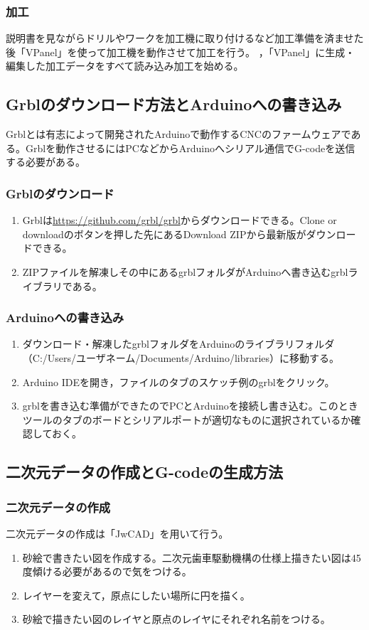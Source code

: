 \documentclass[dvipdfmx]{jsarticle}
\begin{document}
\subsubsection{加工}
説明書を見ながらドリルやワークを加工機に取り付けるなど加工準備を済ませた後「VPanel」を使って加工機を動作させて加工を行う。
，「VPanel」に生成・編集した加工データをすべて読み込み加工を始める。

\subsection{Grblのダウンロード方法とArduinoへの書き込み}
Grblとは有志によって開発されたArduinoで動作するCNCのファームウェアである。Grblを動作させるにはPCなどからArduinoへシリアル通信でG-codeを送信する必要がある。
\subsubsection{Grblのダウンロード}
\begin{enumerate}
    \item Grblは\url{https://github.com/grbl/grbl}からダウンロードできる。Clone or downloadのボタンを押した先にあるDownload ZIPから最新版がダウンロードできる。
    \item ZIPファイルを解凍しその中にあるgrblフォルダがArduinoへ書き込むgrblライブラリである。
\end{enumerate}
\subsubsection{Arduinoへの書き込み}
\begin{enumerate}
    \item ダウンロード・解凍したgrblフォルダをArduinoのライブラリフォルダ（C:/Users/ユーザネーム/Documents/Arduino/libraries）に移動する。
    \item Arduino IDEを開き，ファイルのタブのスケッチ例のgrblをクリック。
    \item grblを書き込む準備ができたのでPCとArduinoを接続し書き込む。このときツールのタブのボードとシリアルポートが適切なものに選択されているか確認しておく。
\end{enumerate}

\subsection{二次元データの作成とG-codeの生成方法}
\subsubsection{二次元データの作成}
二次元データの作成は「JwCAD」を用いて行う。
\begin{enumerate}
    \item 砂絵で書きたい図を作成する。二次元歯車駆動機構の仕様上描きたい図は45度傾ける必要があるので気をつける。
    \item レイヤーを変えて，原点にしたい場所に円を描く。
    \item 砂絵で描きたい図のレイヤと原点のレイヤにそれぞれ名前をつける。
\end{enumerate}
\end{document}
